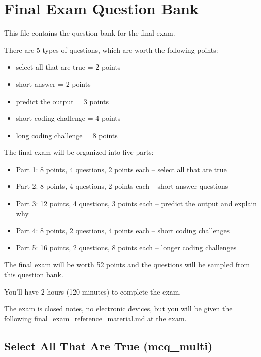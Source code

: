 \documentclass[
  11pt,
]{article}
\author{}
\date{}
\providecommand{\tightlist}{%
  \setlength{\itemsep}{0pt}\setlength{\parskip}{0pt}}
\begin{document}
\section{Final Exam Question Bank}\label{final-exam-question-bank}

This file contains the question bank for the final exam.

There are 5 types of questions, which are worth the following points:

\begin{itemize}
\tightlist
\item
  select all that are true = 2 points
\item
  short answer = 2 points
\item
  predict the output = 3 points
\item
  short coding challenge = 4 points
\item
  long coding challenge = 8 points
\end{itemize}

The final exam will be organized into five parts:

\begin{itemize}
\tightlist
\item
  Part 1: 8 points, 4 questions, 2 points each -- select all that are
  true
\item
  Part 2: 8 points, 4 questions, 2 points each -- short answer questions
\item
  Part 3: 12 points, 4 questions, 3 points each -- predict the output
  and explain why
\item
  Part 4: 8 points, 2 questions, 4 points each -- short coding
  challenges
\item
  Part 5: 16 points, 2 questions, 8 points each -- longer coding
  challenges
\end{itemize}

The final exam will be worth 52 points and the questions will be sampled
from this question bank.

You'll have 2 hours (120 minutes) to complete the exam.

The exam is closed notes, no electronic devices, but you will be given
the following \url{final_exam_reference_material.md} at the exam.

\subsection{Select All That Are True
(mcq\_multi)}\label{select-all-that-are-true-mcq_multi}
\end{document}
